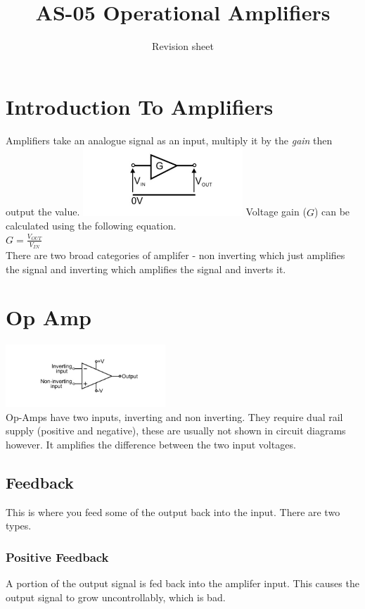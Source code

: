 \documentclass[a4paper,11pt, twocolumn]{article}
\title{AS-05 Operational Amplifiers}
\author{Revision sheet}
\date{}
\begin{document}
\maketitle
\thispagestyle{fancy}

\section{Introduction To Amplifiers}
Amplifiers take an analogue signal as an input, multiply it by the \textit{gain} then output the value.
\includegraphics[width=0.45\textwidth]{basicAmp.jpg}
Voltage gain ($G$) can be calculated using the following equation.\\
$\displaystyle G = \frac{V_{OUT}}{V_{IN}}$\\
There are two broad categories of amplifer - non inverting which just amplifies the signal and inverting which amplifies the signal and inverts it.

\section{Op Amp}
\includegraphics[width=0.45\textwidth]{opAmp.jpg}\\
Op-Amps have two inputs, inverting and non inverting. They require dual rail supply (positive and negative), these are usually not shown in circuit diagrams however. It amplifies the difference between the two input voltages. 
\subsection{Feedback}
This is where you feed some of the output back into the input. There are two types.
\subsubsection{Positive Feedback}
A portion of the output signal is fed back into the amplifer input. This causes the output signal to grow uncontrollably, which is bad.
\end{document}
